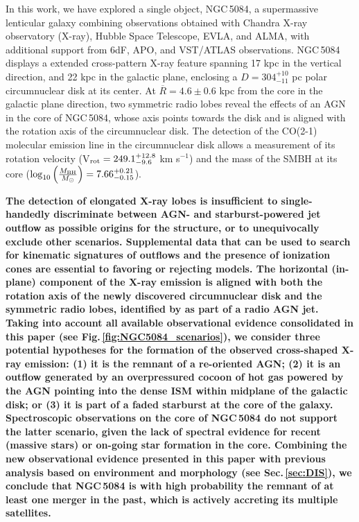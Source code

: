 \documentclass[modern]{CORE-AAS/aastex631}
\begin{document}
{In this work, we have explored a single object, NGC\,5084, a supermassive lenticular galaxy combining observations obtained with Chandra X-ray observatory (X-ray), Hubble Space Telescope, EVLA, and ALMA, with additional support from 6dF, APO, and VST/ATLAS observations. NGC\,5084 displays a extended cross-pattern X-ray feature spanning 17 kpc in the vertical direction, and 22 kpc in the galactic plane, enclosing a $D=304^{+10}_{-11}$ pc polar circumnuclear disk at its center. At $\overline{R}=4.6\pm0.6$ kpc from the core in the galactic plane direction, two symmetric radio lobes reveal the effects of an AGN in the core of NGC\,5084, whose axis points towards the disk and is aligned with the rotation axis of the circumnuclear disk. The detection of the CO(2-1) molecular emission line in the circumnuclear disk allows a measurement of its rotation velocity (V$_{\rm rot} = 249.1^{+12.8}_{-9.6}$ km s$^{-1}$) and the mass of the SMBH at its core ($\log_{10}\left( \frac{M_{\rm BH}}{M_{\odot}} \right) = 7.66^{+0.21}_{-0.15}$). \par 

\textbf{The detection of elongated X-ray lobes is insufficient to single-handedly discriminate between AGN- and starburst-powered jet outflow as possible origins for the structure, or to unequivocally exclude other scenarios. Supplemental data that can be used to search for kinematic signatures of outflows and the presence of ionization cones are essential to favoring or rejecting models.   
The horizontal (in-plane) component of the X-ray emission is aligned with both the rotation axis of the newly discovered circumnuclear disk and the symmetric radio lobes, identified by \citet{irwin+2019aj158_21} as part of a radio AGN jet. Taking into account all available observational evidence consolidated in this paper (see Fig.\,\ref{fig:NGC5084_scenarios}), we consider three potential hypotheses for the formation of the observed cross-shaped X-ray emission: (1) it is the remnant of a re-oriented AGN; (2) it is an outflow generated by an overpressured cocoon of hot gas powered by the AGN pointing into the dense ISM within midplane of the galactic disk; or (3) it is part of a faded starburst at the core of the galaxy. Spectroscopic observations on the core of NGC\,5084 do not support the latter scenario, given the lack of spectral evidence for recent (massive stars) or on-going star formation in the core.  Combining the new observational evidence presented in this paper with previous analysis based on environment and morphology (see Sec.\,\ref{sec:DIS}), we conclude that NGC\,5084 is with high probability the remnant of at least one merger in the past, which is actively accreting its multiple satellites.}

}
\end{document}
